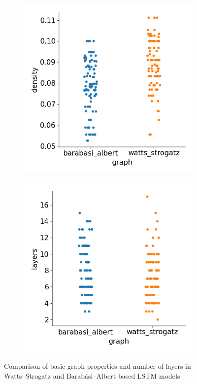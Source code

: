 \begin{figure}[H]
    \bigskip
    \begin{subfigure}{0.45\textwidth}
        \includegraphics[width=\linewidth]{images/results/random/lstm/graph_density.png}
        \caption{} \label{fig:lstm_graph_density}
    \end{subfigure}
    \hfill
    \begin{subfigure}{0.45\textwidth}
        \includegraphics[width=\linewidth]{images/results/random/lstm/graph_layers.png}
        \caption{} \label{fig:lstm_graph_layers}
    \end{subfigure}

\caption[Comparison of basic graph properties and number of layers in WS and BA based LSTM models]{Comparison of basic graph properties and number of layers in Watts–Strogatz and Barabási–Albert based LSTM models} \label{fig:lstm_graphs}
\end{figure}

